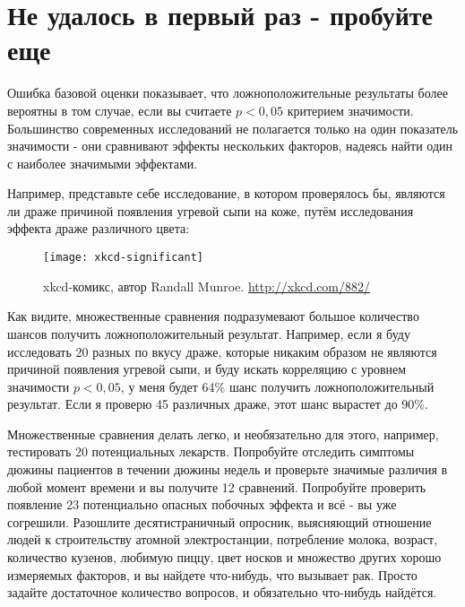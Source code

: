 \section[Не удалось в первый раз - пробуйте еще]{Не удалось в первый раз - пробуйте еще}
\label{chp5:try-again}

Ошибка базовой оценки показывает, что ложноположительные результаты более вероятны в том случае, если вы считаете $p < 0,05$ критерием значимости. Большинство современных исследований не полагается только на один показатель значимости - они сравнивают эффекты нескольких факторов, надеясь найти один с наиболее значимыми эффектами.

Например, представьте себе исследование, в котором проверялось бы, являются ли драже причиной появления угревой сыпи на коже, путём исследования эффекта драже различного цвета: %

\newpage %

\begin{figure}[h!]
    \centering
    \texttt{[image: xkcd-significant]}
    \caption{xkcd-комикс, автор Randall Munroe. \href{http://xkcd.com/882/}{http://xkcd.com/882/}}
    \label{fig5:xkcd-significant}
\end{figure}

Как видите, множественные сравнения подразумевают большое количество шансов получить ложноположительный результат. Например, если я буду исследовать 20 разных по вкусу драже, которые никаким образом не являются причиной появления угревой сыпи, и буду искать корреляцию с уровнем значимости $p < 0,05$, у меня будет 64\% шанс получить ложноположительный результат.\cite{smith_impact_1987} Если я проверю 45 различных драже, этот шанс вырастет до 90\%.

Множественные сравнения делать легко, и необязательно для этого, например, тестировать 20 потенциальных лекарств. Попробуйте отследить симптомы дюжины пациентов в течении дюжины недель и проверьте значимые различия в любой момент времени и вы получите 12 сравнений. Попробуйте проверить появление 23 потенциально опасных побочных эффекта и всё - вы уже согрешили. Разошлите десятистраничный опросник, выясняющий отношение людей к строительству атомной электростанции, потребление молока, возраст, количество кузенов, любимую пиццу, цвет носков и множество других хорошо измеряемых факторов, и вы найдете что-нибудь, что вызывает рак. Просто задайте достаточное количество вопросов, и обязательно что-нибудь найдётся.

